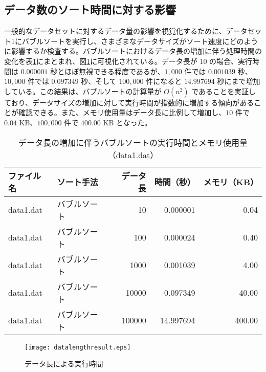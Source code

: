 \documentclass[a4j, 11pt]{jarticle}
\begin{document}
\subsection{データ数のソート時間に対する影響}
一般的なデータセットに対するデータ量の影響を視覚化するために、データセット1にバブルソートを実行し、さまざまなデータサイズがソート速度にどのように影響するか検査する。バブルソートにおけるデータ長の増加に伴う処理時間の変化を表\ref{bubblesortscaling}にまとまれ、図\ref{datalengthresultgraph}に可視化されている。データ長が $10$ の場合、実行時間は $0.000001$ 秒とほぼ無視できる程度であるが、$1,000$ 件では $0.001039$ 秒、$10,000$ 件では $0.097349$ 秒、そして $100,000$ 件になると $14.997694$ 秒にまで増加している。この結果は、バブルソートの計算量が $O(n^2)$ であることを実証しており、データサイズの増加に対して実行時間が指数的に増加する傾向があることが確認できる。また、メモリ使用量はデータ長に比例して増加し、$10$ 件で $0.04$ KB、$100,000$ 件で $400.00$ KB となった。
\begin{table}[H]
  \centering
  \caption{データ長の増加に伴うバブルソートの実行時間とメモリ使用量（data1.dat）}
  \label{bubblesortscaling}
  \begin{tabular}{|l|l|r|r|r|}
    \hline
    \textbf{ファイル名} & \textbf{ソート手法} & \textbf{データ長} & \textbf{時間（秒）} & \textbf{メモリ（KB）} \\
    \hline
    data1.dat & バブルソート & 10      & 0.000001  & 0.04   \\
    data1.dat & バブルソート & 100     & 0.000024  & 0.40   \\
    data1.dat & バブルソート & 1000    & 0.001039  & 4.00   \\
    data1.dat & バブルソート & 10000   & 0.097349  & 40.00  \\
    data1.dat & バブルソート & 100000  & 14.997694 & 400.00 \\
    \hline
  \end{tabular}
\end{table}

\begin{figure}[H]
  \centering
  \texttt{[image: datalengthresult.eps]}
  \caption{データ長による実行時間}\label{datalengthresultgraph}
\end{figure}
\end{document}
